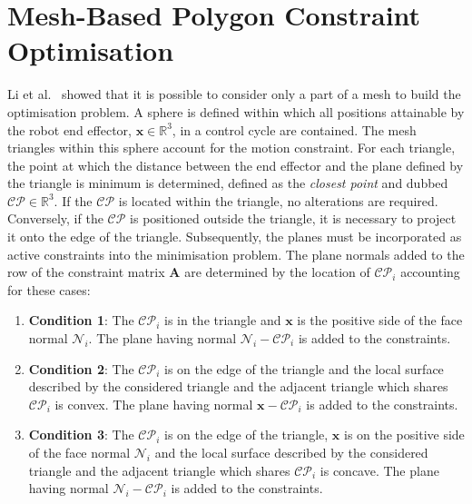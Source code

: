 \section{Mesh-Based Polygon Constraint Optimisation}
Li et al.~\cite{li2020anatomical} showed that it is possible to consider
only a part of a mesh to build the optimisation problem. A sphere is
defined within which all positions attainable by the robot end
effector, $\boldsymbol{x} \in \mathbb{R}^3$, in a control cycle are
contained. The mesh triangles within this sphere account for the
motion constraint. For each triangle, the point at which the distance
between the end effector and the plane defined by the triangle is
minimum is determined, defined as the \textit{closest point} and
dubbed $\mathcal{CP} \in \mathbb{R}^3$. If the $\mathcal{CP}$ is
located within the triangle, no alterations are required. Conversely,
if the $\mathcal{CP}$ is positioned outside the triangle, it is
necessary to project it onto the edge of the triangle.  Subsequently,
the planes must be incorporated as active constraints into the
minimisation problem.  The plane normals added to the row of the
constraint matrix $\boldsymbol{A}$ are determined by the location of
$\mathcal{CP}_i$ accounting for these cases:
\begin{enumerate}

\item \textbf{Condition 1}: The $\mathcal{CP}_i$ is in the triangle
  and $\boldsymbol{x}$ is the positive side of the face normal
  $\mathcal{N}_i$. The plane having normal
  $\mathcal{N}_i - \mathcal{CP}_i$ is added to the constraints.

\item \textbf{Condition 2}: The $\mathcal{CP}_i$ is on the edge of the
  triangle and the local surface described by the considered triangle
  and the adjacent triangle which shares $\mathcal{CP}_i$ is
  convex. The plane having normal $\boldsymbol{x}-\mathcal{CP}_i$ is
  added to the constraints.
  
\item \textbf{Condition 3}: The $\mathcal{CP}_i$ is on the edge of the
  triangle, $\boldsymbol{x}$ is on the positive side of the face
  normal $ \mathcal{N}_i$ and the local surface described by the
  considered triangle and the adjacent triangle which shares
  $\mathcal{CP}_i$ is concave. The plane having normal
  $\mathcal{N}_i - \mathcal{CP}_i$ is added to the constraints.
\end{enumerate}

